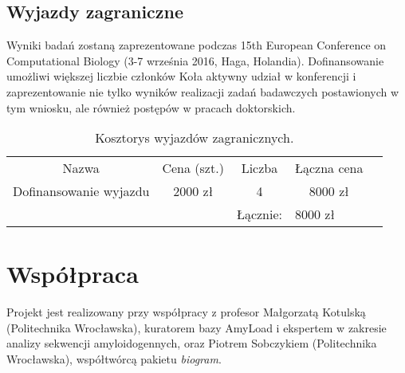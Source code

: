 \documentclass{article}
\begin{document}
\subsection{Wyjazdy zagraniczne}

Wyniki badań zostaną zaprezentowane podczas 15th European Conference on Computational Biology (3-7 września 2016, Haga, Holandia). Dofinansowanie umożliwi większej liczbie członków Koła aktywny udział w konferencji i zaprezentowanie nie tylko wyników realizacji zadań badawczych postawionych w tym wniosku, ale również postępów w pracach doktorskich.

\begin{table}[!htbp]
\centering
\caption*{Kosztorys wyjazdów zagranicznych.}
\begin{tabular}{lllll}
\cline{1-4}
\multicolumn{1}{|c|}{Nazwa}                     & \multicolumn{1}{c|}{Cena (szt.)} & \multicolumn{1}{c|}{Liczba} & \multicolumn{1}{c|}{Łączna cena} &  \\ \cline{1-4}
\multicolumn{1}{|c|}{Dofinansowanie wyjazdu} & \multicolumn{1}{c|}{2000 zł}     & \multicolumn{1}{c|}{4}      & \multicolumn{1}{c|}{8000 zł}     &  \\ \cline{1-4}
                                                &                                  & Łącznie:                    & 8000 zł                          & 
\end{tabular}
\end{table}

\section{Współpraca}

Projekt jest realizowany przy współpracy z profesor Małgorzatą Kotulską (Politechnika Wrocławska), kuratorem bazy AmyLoad i ekspertem w zakresie analizy sekwencji amyloidogennych, oraz Piotrem Sobczykiem (Politechnika Wrocławska), współtwórcą pakietu \textit{biogram}.


 

\end{document}
